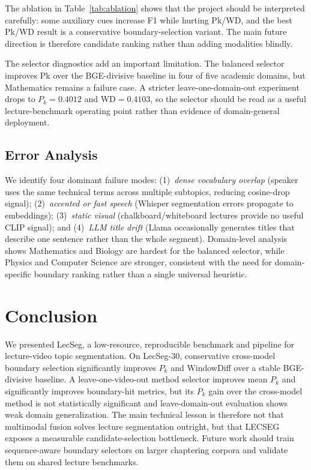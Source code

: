 \documentclass[conference]{IEEEtran}
\newcommand{\lecseg}{LecSeg}
\newcommand{\dataset}{LecSeg-30}
\begin{document}
The ablation in Table~\ref{tab:ablation} shows that the project should be
interpreted carefully: some auxiliary cues increase F1 while hurting Pk/WD, and
the best Pk/WD result is a conservative boundary-selection variant. The main
future direction is therefore candidate ranking rather than adding modalities
blindly.

The selector diagnostics add an important limitation. The balanced selector
improves Pk over the BGE-divisive baseline in four of five academic domains,
but Mathematics remains a failure case. A stricter leave-one-domain-out
experiment drops to $P_k=0.4012$ and WD$=0.4103$, so the selector should be
read as a useful lecture-benchmark operating point rather than evidence of
domain-general deployment.

\subsection{Error Analysis}

We identify four dominant failure modes: (1)~\textit{dense vocabulary overlap}
(speaker uses the same technical terms across multiple subtopics, reducing
cosine-drop signal); (2)~\textit{accented or fast speech} (Whisper
segmentation errors propagate to embeddings); (3)~\textit{static visual}
(chalkboard/whiteboard lectures provide no useful CLIP signal); and
(4)~\textit{LLM title drift} (Llama occasionally generates titles that
describe one sentence rather than the whole segment). Domain-level analysis
shows Mathematics and Biology are hardest for the balanced selector, while
Physics and Computer Science are stronger, consistent with the need for
domain-specific boundary ranking rather than a single universal heuristic.

\section{Conclusion}

We presented \lecseg{}, a low-resource, reproducible benchmark and pipeline for
lecture-video topic segmentation. On \dataset{}, conservative cross-model
boundary selection significantly improves $P_k$ and WindowDiff over a stable
BGE-divisive baseline. A leave-one-video-out method selector improves mean
$P_k$ and significantly improves boundary-hit metrics, but its $P_k$ gain over
the cross-model method is not statistically significant and leave-domain-out
evaluation shows weak domain generalization. The main technical lesson is
therefore not that multimodal fusion
solves lecture segmentation outright, but that LECSEG exposes a measurable
candidate-selection bottleneck. Future work should train sequence-aware
boundary selectors on larger chaptering corpora and validate them on shared
lecture benchmarks.
\end{document}
